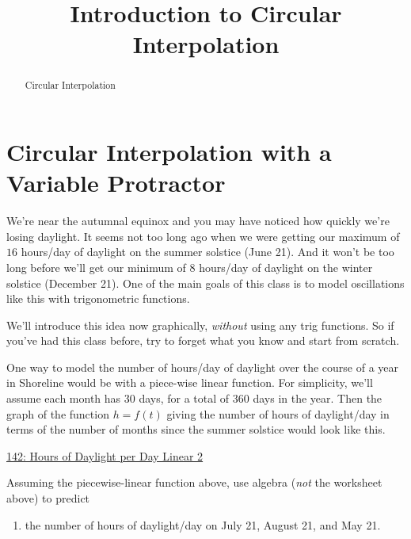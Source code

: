 \documentclass{ximera}
\title{Introduction to Circular Interpolation}
\begin{document}
\begin{abstract}
Circular Interpolation
\end{abstract}
\maketitle

\section{Circular Interpolation with a Variable Protractor}


\begin{example}  \label{Ex:KDreDFerdfdsa}
We're near the autumnal equinox and you may have noticed how quickly we're losing daylight. It seems not too long ago when we were getting our maximum of $16$ hours/day of daylight on the summer solstice (June 21). And it won't be too long before we'll get our minimum of $8$ hours/day of daylight on the winter solstice (December 21). One of the main goals of this class is to model oscillations like this with trigonometric functions.

We'll introduce this idea now graphically, \emph{without} using any trig functions. So if you've had this class before, try to forget what you know and start from scratch.

One way to model the number of hours/day of daylight over the course of a year in Shoreline would be with a piece-wise linear function. For simplicity, we'll assume each month has 30 days, for a total of 360 days in the year. Then the graph of the function $h=f(t)$ giving the number of hours of daylight/day in terms of the number of months since the summer solstice would look like this.

\begin{onlineOnly}
    \begin{center}
\end{center}
\end{onlineOnly}

\href{https://www.desmos.com/calculator/swvhkxim4w}{142: Hours of Daylight per Day Linear 2}

\begin{question}  \label{Q98dfrdedsfdsf}

Assuming the piecewise-linear function above, use algebra (\emph{not} the worksheet above) to predict 
\begin{enumerate}
\item the number of hours of daylight/day on July 21, August 21, and May 21.


\end{enumerate}
\end{question}
\end{example}
\end{document}
